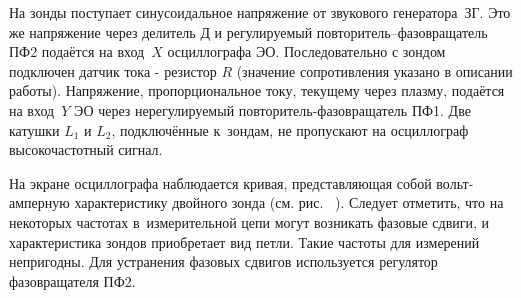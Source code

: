 На зонды поступает синусоидальное напряжение от звукового генератора~ЗГ. Это же напряжение через делитель Д и регулируемый повторитель--фазовращатель ПФ2
подаётся на вход~$X$ осциллографа ЭО. Последовательно с зондом подключен датчик тока - резистор $R$ (значение сопротивления указано в описании работы). Напряжение, пропорциональное току, текущему через плазму, подаётся на вход~$Y$ ЭО через нерегулируемый повторитель-фазовращатель ПФ1. Две катушки $L_{1}$  и $L_{2}$, подключённые к~зондам, не пропускают на осциллограф высокочастотный сигнал. 

На
экране осциллографа наблюдается кривая, представляющая собой вольт-амперную характеристику двойного зонда (см.
рис.~%
). Следует отметить, что на некоторых частотах в~измерительной цепи могут возникать фазовые сдвиги, и
характеристика зондов приобретает вид петли. Такие частоты для измерений непригодны. Для устранения фазовых сдвигов используется регулятор фазовращателя ПФ2.  



